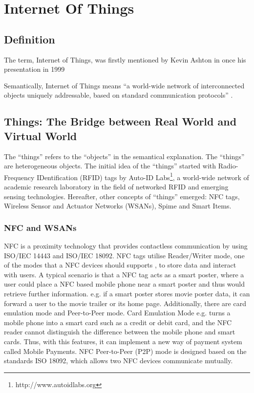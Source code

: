 \chapter{Internet Of Things}
\label{chapter:internetofthings} 

\section{Definition}

The term, Internet of Things, was firstly mentioned by Kevin Ashton in once his presentation in 1999 \cite{ashton2009internet}

Semantically, Internet of Things means ``a world-wide network of interconnected objects uniquely addressable, based on standard communication protocols'' \cite{infso2008networked}. 

\section{Things: The Bridge between Real World and Virtual World}

The ``things'' refers to the ``objects'' in the semantical explanation. The ``things'' are heterogeneous objects. The initial idea of the ``things'' started with Radio-Frequency IDentification (RFID) tags by Auto-ID Labs\footnote{http://www.autoidlabs.org}, a world-wide network of academic research laboratory in the field of networked RFID and emerging sensing technologies. Hereafter, other concepts of ``things'' emerged: NFC tags, Wireless Sensor and Actuator Networks (WSANs), Spime and Smart Items.

\subsection{NFC and WSANs}

NFC is a proximity technology that provides contactless communication by using ISO/IEC 14443 and ISO/IEC 18092. NFC tags utilise Reader/Writer mode, one of the modes that a NFC devices should supports \cite{Madlmayr:SecurityandPrivacy}, to store data and interact with users. A typical scenario is that a NFC tag acts as a smart poster, where a user could place a NFC based mobile phone near a smart poster and thus would retrieve further information. e.g. if a smart poster stores movie poster data, it can forward a user to the movie trailer or its home page. Additionally, there are card emulation mode and Peer-to-Peer mode. Card Emulation Mode e.g. turns a mobile phone into a smart card such as a credit or debit card, and the NFC reader cannot distinguish the difference between the mobile phone and smart cards. Thus, with this features, it can implement a new way of payment system called Mobile Payments. NFC Peer-to-Peer (P2P) mode is designed based on the standards ISO 18092, which allows two NFC devices communicate mutually. \cite{Madlmayr:SecurityandPrivacy}

